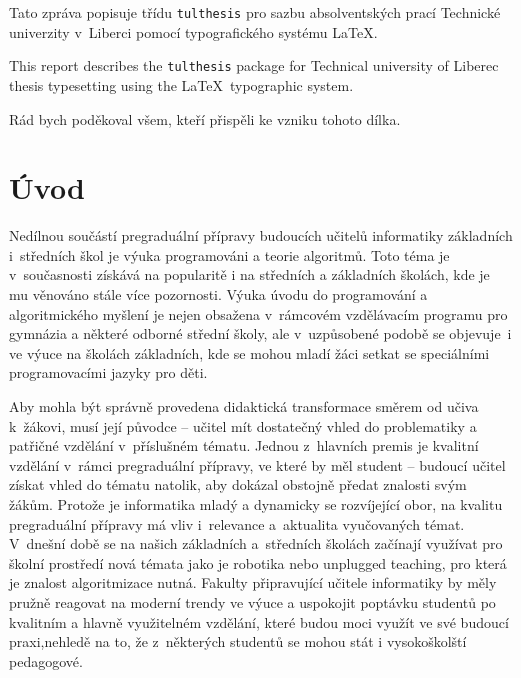 \documentclass[FP,DP]{tulthesis}
\begin{document}

\begin{abstractCZ}
Tato zpráva popisuje třídu \texttt{tulthesis} pro sazbu absolventských prací
Technické univerzity v~Liberci pomocí typografického systému \LaTeX.
\end{abstractCZ}

\vspace{2cm}

\begin{abstractEN}
This report describes the \texttt{tulthesis} package for Technical university of
Liberec thesis typesetting using the \LaTeX\ typographic system.
\end{abstractEN}

\clearpage

\begin{acknowledgement}
Rád bych poděkoval všem, kteří přispěli ke vzniku tohoto dílka.
\end{acknowledgement}

\tableofcontents

\clearpage

\chapter{Úvod}
Nedílnou součástí pregraduální přípravy budoucích učitelů informatiky základních i~středních škol je výuka programováni a teorie algoritmů. Toto téma je v~současnosti získává na popularitě i na středních a základních školách, kde je mu věnováno stále více pozornosti. Výuka úvodu do programování a algoritmického myšlení je nejen obsažena v~rámcovém vzdělávacím programu pro gymnázia a některé odborné střední školy, ale v~uzpůsobené podobě se objevuje~i ve výuce na školách základních, kde se mohou mladí žáci setkat se speciálními programovacími jazyky pro děti.

Aby mohla být správně provedena didaktická transformace směrem od učiva k~žákovi, musí její původce -- učitel mít dostatečný vhled do problematiky a~ patřičné vzdělání v~příslušném tématu. Jednou z~hlavních premis je kvalitní vzdělání v~rámci pregraduální přípravy, ve které by měl student -- budoucí učitel získat vhled do tématu natolik, aby dokázal obstojně předat znalosti svým žákům.  Protože je informatika mladý a dynamicky se rozvíjející obor, na kvalitu pregraduální přípravy má vliv i~relevance a~aktualita vyučovaných témat. V~dnešní době se na našich základních a~středních školách začínají využívat pro školní prostředí nová témata jako je robotika nebo unplugged teaching, pro která je znalost algoritmizace nutná. Fakulty připravující učitele informatiky by měly pružně reagovat na moderní trendy ve výuce a uspokojit poptávku studentů po kvalitním a hlavně využitelném vzdělání, které budou moci využít ve své budoucí praxi,nehledě na to, že z~některých studentů se mohou stát i vysokoškolští pedagogové.  
\end{document}
